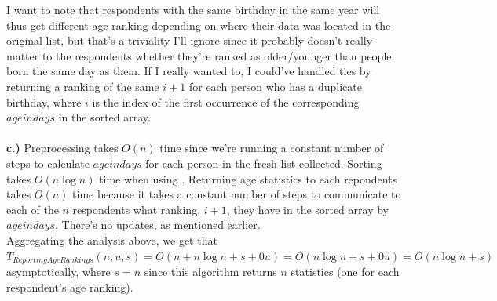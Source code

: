 \documentclass[11pt]{article}
\begin{document}
\begin{enumerate}
{I want to note that respondents with the same birthday in the same year will thus get different age-ranking depending on where their data was located in the original list, but that's a triviality I'll ignore since it probably doesn't really matter to the respondents whether they're ranked as older/younger than people born the same day as them. If I really wanted to, I could've handled ties by returning a ranking of the same $i+1$ for each person who has a duplicate birthday, where $i$ is the index of the first occurrence of the corresponding $ageindays$ in the sorted array.\\ \\
\textbf{c.)} Preprocessing takes $O(n)$ time since we're running a constant number of steps to calculate $ageindays$ for each person in the fresh list collected. Sorting takes $O(n\log{n})$ time when using \MergeSort{}. Returning age statistics to each repondents takes $O(n)$ time because it takes a constant number of steps to communicate to each of the $n$ respondents what ranking, $i+1$, they have in the sorted array by $ageindays$. There's no updates, as mentioned earlier. \\
Aggregating the analysis above, we get that $T_{ReportingAgeRankings}(n, u, s) = O(n + n\log{n} + s + 0u) = O(n\log{n} + s + 0u) = O(n\log{n} + s)$ asymptotically, where $s=n$ since this algorithm returns $n$ statistics (one for each respondent's age ranking).
} \\
\\


\end{enumerate}
\end{document}
